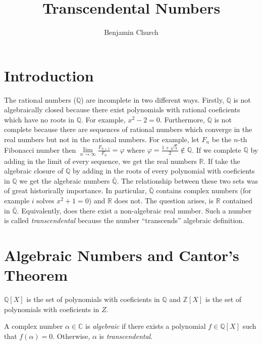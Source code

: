 \documentclass{article}
\newcommand{\Z}{\mathbb{Z}}
\newcommand{\C}{\mathbb{C}}
\newcommand{\Q}{\mathbb{Q}}
\newcommand{\R}{\mathbb{R}}
\newenvironment{definition}[1][Definition:]{\begin{trivlist}
\item[\hskip \labelsep {\bfseries #1}]}{\end{trivlist}}
\theoremstyle{theorem}
\theoremstyle{definition}
\theoremstyle{definition}
\theoremstyle{remark}
\theoremstyle{definition}
\theoremstyle{remark}
\begin{document}
\author{Benjamin Church}
\title{\Huge Transcendental Numbers}

\maketitle
\tableofcontents
\newpage


\section{Introduction}

The rational numbers ($\Q$) are incomplete in two different ways. Firstly, $\Q$ is not algebraically closed because there exist polynomials with rational coeficients which have no roots in $\Q$. For example, $x^2 - 2 = 0$. Furthermore, $\Q$ is not complete because there are sequences of rational numbers which converge in the real numbers but not in the rational numbers. For example, let $F_n$ be the $n$-th Fibonacci number then $\lim\limits_{n \to \infty} \frac{F_{n+1}}{F_n} = \varphi$ where $\varphi = \frac{1 + \sqrt{5}}{2} \notin \Q$. If we complete $\Q$ by adding in the limit of every sequence, we get the real numbers $\R$. If take the algebraic closure of $\Q$ by adding in the roots of every polynomial with coeficients in $\Q$ we get the algebraic numbers $\bar{\Q}$. The relationship between these two sets was of great historically importance. In particular, $\bar{\Q}$ contains complex numbers (for example $i$ solves $x^2 + 1 = 0$) and $\R$ does not. The question arises, is $\R$ contained in $\bar{\Q}$. Equivalently, does there exist a non-algebraic real number. Such a number is called \textit{transcendental} because the number ``transcends'' algebraic definition.   

\section{Algebraic Numbers and Cantor's Theorem}

\begin{definition}
$\Q[X]$ is the set of polynomials with coeficients in $\Q$ and $\Z[X]$ is the set of polynomials with coeficients in $Z$.  
\end{definition}

\begin{definition}
A complex number $\alpha \in \C$ is \textit{algebraic} if there exists a polynomial $f \in \Q[X]$ such that $f(\alpha) = 0$. Otherwise, $\alpha$ is \textit{transcendental}. 
\end{definition}
\end{document}
